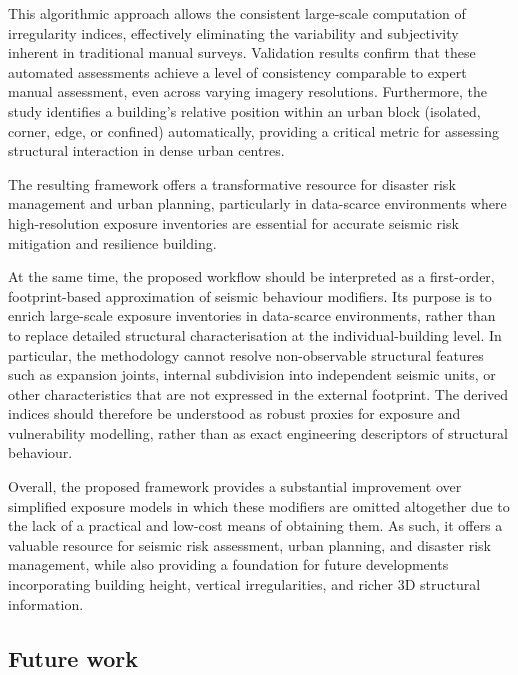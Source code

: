 \begin{refsection}
This algorithmic approach allows the consistent large-scale computation of irregularity indices, effectively eliminating the variability and subjectivity inherent in traditional manual surveys. Validation results confirm that these automated assessments achieve a level of consistency comparable to expert manual assessment, even across varying imagery resolutions. Furthermore, the study identifies a building’s relative position within an urban block (isolated, corner, edge, or confined) automatically, providing a critical metric for assessing structural interaction in dense urban centres.

The resulting framework offers a transformative resource for disaster risk management and urban planning, particularly in data-scarce environments where high-resolution exposure inventories are essential for accurate seismic risk mitigation and resilience building.

At the same time, the proposed workflow should be interpreted as a first-order, footprint-based approximation of seismic behaviour modifiers. Its purpose is to enrich large-scale exposure inventories in data-scarce environments, rather than to replace detailed structural characterisation at the individual-building level. In particular, the methodology cannot resolve non-observable structural features such as expansion joints, internal subdivision into independent seismic units, or other characteristics that are not expressed in the external footprint. The derived indices should therefore be understood as robust proxies for exposure and vulnerability modelling, rather than as exact engineering descriptors of structural behaviour.

Overall, the proposed framework provides a substantial improvement over simplified exposure models in which these modifiers are omitted altogether due to the lack of a practical and low-cost means of obtaining them. As such, it offers a valuable resource for seismic risk assessment, urban planning, and disaster risk management, while also providing a foundation for future developments incorporating building height, vertical irregularities, and richer 3D structural information.


\subsection{Future work}


\end{refsection}

